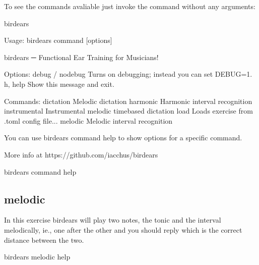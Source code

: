 \documentclass[letterpaper,10pt,english]{sphinxmanual}
\begin{document}
To see the commands avaliable just invoke the command without any arguments:

%
\begin{sphinxVerbatim}[commandchars=\\\{\}]
birdears
\end{sphinxVerbatim}

%
\begin{sphinxVerbatim}[commandchars=\\\{\}]
Usage: birdears  \PYGZlt{}command\PYGZgt{} [options]

  birdears ─ Functional Ear Training for Musicians!

Options:
  \PYGZhy{}\PYGZhy{}debug / \PYGZhy{}\PYGZhy{}no\PYGZhy{}debug  Turns on debugging; instead you can set DEBUG=1.
  \PYGZhy{}h, \PYGZhy{}\PYGZhy{}help            Show this message and exit.

Commands:
  dictation     Melodic dictation
  harmonic      Harmonic interval recognition
  instrumental  Instrumental melodic time\PYGZhy{}based dictation
  load          Loads exercise from .toml config file...
  melodic       Melodic interval recognition

  You can use \PYGZsq{}birdears \PYGZlt{}command\PYGZgt{} \PYGZhy{}\PYGZhy{}help\PYGZsq{} to show options for a specific
  command.

  More info at https://github.com/iacchus/birdears
\end{sphinxVerbatim}

%
\begin{sphinxVerbatim}[commandchars=\\\{\}]
birdears \PYGZlt{}command\PYGZgt{} \PYGZhy{}\PYGZhy{}help
\end{sphinxVerbatim}


\subsection{melodic}
\label{\detokenize{using:melodic}}
In this exercise birdears will play two notes, the tonic and the interval
melodically, ie., one after the other and you should reply which is the
correct distance between the two.

%
\begin{sphinxVerbatim}[commandchars=\\\{\}]
birdears melodic \PYGZhy{}\PYGZhy{}help
\end{sphinxVerbatim}
\end{document}

